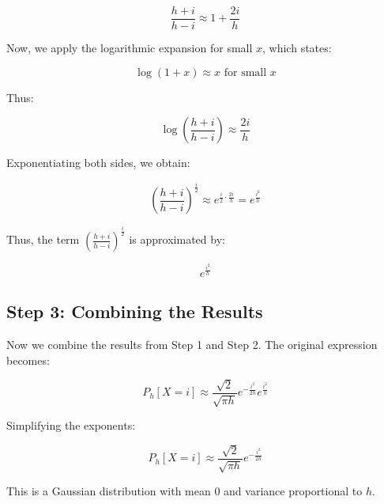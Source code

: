 \documentclass{article}
\begin{document}
\[
\frac{h+i}{h-i} \approx 1 + \frac{2i}{h}
\]

Now, we apply the logarithmic expansion for small $x$, which states:

\[
\log(1 + x) \approx x \text{ for small } x
\]

Thus:

\[
\log\left( \frac{h+i}{h-i} \right) \approx \frac{2i}{h}
\]

Exponentiating both sides, we obtain:

\[
\left( \frac{h+i}{h-i} \right)^{\frac{i}{2}} \approx e^{\frac{i}{2} \cdot \frac{2i}{h}} = e^{\frac{i^2}{h}}
\]

Thus, the term $\left(\frac{h+i}{h-i}\right)^{\frac{i}{2}}$ is approximated by:

\[
e^{\frac{i^2}{h}}
\]

\subsection*{Step 3: Combining the Results}

Now we combine the results from Step 1 and Step 2. The original expression becomes:

\[
P_h[X = i] \approx \frac{\sqrt{2}}{\sqrt{\pi h}} e^{-\frac{i^2}{2h}} e^{\frac{i^2}{h}}
\]

Simplifying the exponents:

\[
P_h[X = i] \approx \frac{\sqrt{2}}{\sqrt{\pi h}} e^{-\frac{i^2}{2h}}
\]

This is a Gaussian distribution with mean 0 and variance proportional to $h$.
\end{document}

